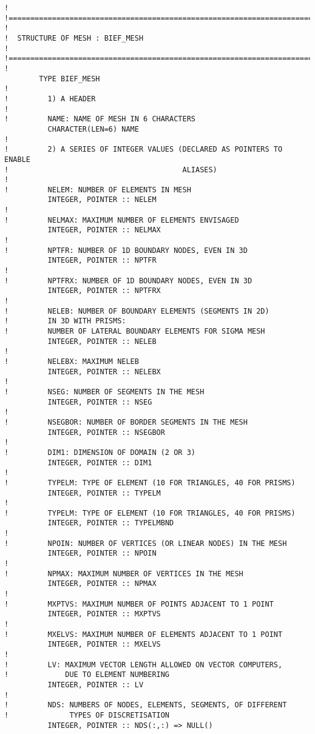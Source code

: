 \begin{lstlisting}[language=TelFortran]
!
!=======================================================================
!
!  STRUCTURE OF MESH : BIEF_MESH
!
!=======================================================================
!
        TYPE BIEF_MESH
!
!         1) A HEADER
!
!         NAME: NAME OF MESH IN 6 CHARACTERS
          CHARACTER(LEN=6) NAME
!
!         2) A SERIES OF INTEGER VALUES (DECLARED AS POINTERS TO ENABLE
!                                        ALIASES)
!
!         NELEM: NUMBER OF ELEMENTS IN MESH
          INTEGER, POINTER :: NELEM
!
!         NELMAX: MAXIMUM NUMBER OF ELEMENTS ENVISAGED
          INTEGER, POINTER :: NELMAX
!
!         NPTFR: NUMBER OF 1D BOUNDARY NODES, EVEN IN 3D
          INTEGER, POINTER :: NPTFR
!
!         NPTFRX: NUMBER OF 1D BOUNDARY NODES, EVEN IN 3D
          INTEGER, POINTER :: NPTFRX
!
!         NELEB: NUMBER OF BOUNDARY ELEMENTS (SEGMENTS IN 2D)
!         IN 3D WITH PRISMS:
!         NUMBER OF LATERAL BOUNDARY ELEMENTS FOR SIGMA MESH
          INTEGER, POINTER :: NELEB
!
!         NELEBX: MAXIMUM NELEB
          INTEGER, POINTER :: NELEBX
!
!         NSEG: NUMBER OF SEGMENTS IN THE MESH
          INTEGER, POINTER :: NSEG
!
!         NSEGBOR: NUMBER OF BORDER SEGMENTS IN THE MESH
          INTEGER, POINTER :: NSEGBOR
!
!         DIM1: DIMENSION OF DOMAIN (2 OR 3)
          INTEGER, POINTER :: DIM1
!
!         TYPELM: TYPE OF ELEMENT (10 FOR TRIANGLES, 40 FOR PRISMS)
          INTEGER, POINTER :: TYPELM
!
!         TYPELM: TYPE OF ELEMENT (10 FOR TRIANGLES, 40 FOR PRISMS)
          INTEGER, POINTER :: TYPELMBND
!
!         NPOIN: NUMBER OF VERTICES (OR LINEAR NODES) IN THE MESH
          INTEGER, POINTER :: NPOIN
!
!         NPMAX: MAXIMUM NUMBER OF VERTICES IN THE MESH
          INTEGER, POINTER :: NPMAX
!
!         MXPTVS: MAXIMUM NUMBER OF POINTS ADJACENT TO 1 POINT
          INTEGER, POINTER :: MXPTVS
!
!         MXELVS: MAXIMUM NUMBER OF ELEMENTS ADJACENT TO 1 POINT
          INTEGER, POINTER :: MXELVS
!
!         LV: MAXIMUM VECTOR LENGTH ALLOWED ON VECTOR COMPUTERS,
!             DUE TO ELEMENT NUMBERING
          INTEGER, POINTER :: LV
!
!         NDS: NUMBERS OF NODES, ELEMENTS, SEGMENTS, OF DIFFERENT
!              TYPES OF DISCRETISATION
          INTEGER, POINTER :: NDS(:,:) => NULL()


\end{lstlisting}
